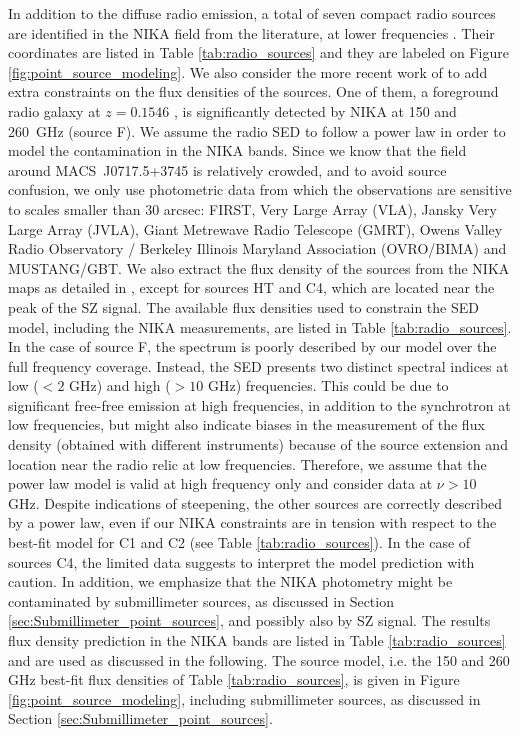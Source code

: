 \documentclass[twocolumn,traditabstract]{aa}
\begin{document}
In addition to the diffuse radio emission, a total of seven compact radio sources are identified in the NIKA field from the literature, at lower frequencies \citep{Condon1998,LaRoque2003,Coble2007,Bonafede2009,vanWeeren2009,Mroczkowski2012,PandeyPommier2013}. Their coordinates are listed in Table \ref{tab:radio_sources} and they are labeled on Figure \ref{fig:point_source_modeling}. We also consider the more recent work of \cite{vanWeeren2016} to add extra constraints on the flux densities of the sources. One of them, a foreground radio galaxy at $z=0.1546$ \citep{vanWeeren2009}, is significantly detected by NIKA at 150 and 260~GHz (source F). We assume the radio SED to follow a power law in order to model the contamination in the NIKA bands. Since we know that the field around \mbox{MACS~J0717.5+3745} is relatively crowded, and to avoid source confusion, we only use photometric data from which the observations are sensitive to scales smaller than 30 arcsec: FIRST, Very Large Array (VLA), Jansky Very Large Array (JVLA), Giant Metrewave Radio Telescope (GMRT), Owens Valley Radio Observatory / Berkeley Illinois Maryland Association (OVRO/BIMA) and MUSTANG/GBT. We also extract the flux density of the sources from the NIKA maps as detailed in \cite{Adam2016}, except for sources HT and C4, which are located near the peak of the SZ signal. The available flux densities used to constrain the SED model, including the NIKA measurements, are listed in Table \ref{tab:radio_sources}. In the case of source F, the spectrum is poorly described by our model over the full frequency coverage. Instead, the SED presents two distinct spectral indices at low ($<2$ GHz) and high ($>10$ GHz) frequencies. This could be due to significant free-free emission at high frequencies, in addition to the synchrotron at low frequencies, but might also indicate biases in the measurement of the flux density (obtained with different instruments) because of the source extension and location near the radio relic at low frequencies. Therefore, we assume that the power law model is valid at high frequency only and consider data at $\nu > 10$ GHz. Despite indications of steepening, the other sources are correctly described by a power law, even if our NIKA constraints are in tension with respect to the best-fit model for C1 and C2 (see Table \ref{tab:radio_sources}). In the case of sources C4, the limited data suggests to interpret the model prediction with caution. In addition, we emphasize that the NIKA photometry might be contaminated by submillimeter sources, as discussed in Section \ref{sec:Submillimeter_point_sources}, and possibly also by SZ signal. The results flux density prediction in the NIKA bands are listed in Table \ref{tab:radio_sources} and are used as discussed in the following. The source model, i.e. the 150 and 260 GHz best-fit flux densities of Table \ref{tab:radio_sources}, is given in Figure \ref{fig:point_source_modeling}, including submillimeter sources, as discussed in Section \ref{sec:Submillimeter_point_sources}.
\end{document}
